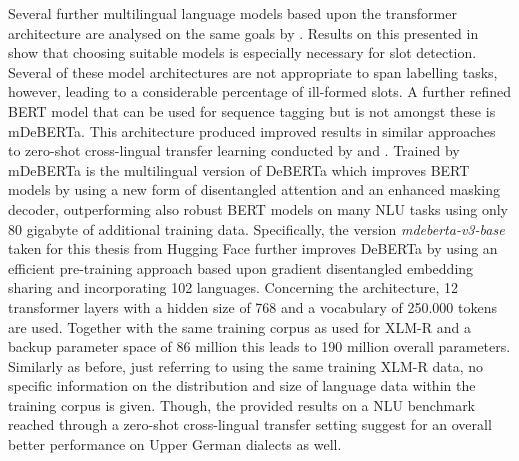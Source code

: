 \documentclass[11pt,a4paper,twoside,openright]{scrbook}
\begin{document}
Several further multilingual language models based upon the transformer architecture are analysed on the same goals by \citet{kwon-etal-2023-sidlr}. Results on this presented in \citet{2023-findings-vardial} show that choosing suitable models is especially necessary for slot detection. Several of these model architectures are not appropriate to span labelling tasks, however, leading to a considerable percentage of ill-formed slots. A further refined BERT model that can be used for sequence tagging but is not amongst these is mDeBERTa. This architecture produced improved results in similar approaches to zero-shot cross-lingual transfer learning conducted by \citet{artemova-etal-2024-exploring} and \citet{moghe-etal-2023-multi3nlu}. Trained by \citet{he2021debertav3, he2021deberta} mDeBERTa is the multilingual version of DeBERTa which improves BERT models by using a new form of disentangled attention and an enhanced masking decoder, outperforming also robust BERT models on many NLU tasks using only 80 gigabyte of additional training data. Specifically, the version \textit{mdeberta-v3-base} taken for this thesis from Hugging Face further improves DeBERTa by using an efficient pre-training approach based upon gradient disentangled embedding sharing and incorporating 102 languages. Concerning the architecture, 12 transformer layers with a hidden size of 768 and a vocabulary of 250.000 tokens are used. Together with the same training corpus as used for XLM-R and a backup parameter space of 86 million this leads to 190 million overall parameters. Similarly as before, just referring to using the same training XLM-R data, no specific information on the distribution and size of language data within the training corpus is given. Though, the provided results on a NLU benchmark reached through a zero-shot cross-lingual transfer setting suggest for an overall better performance on Upper German dialects as well.
\end{document}
